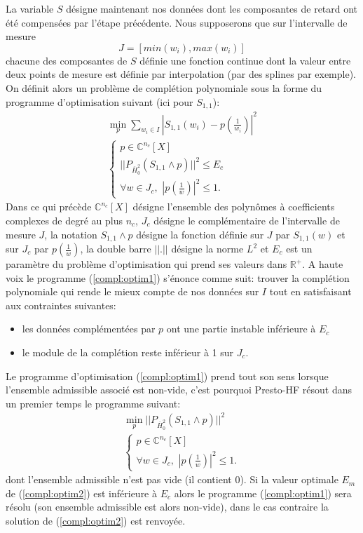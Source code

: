 \documentclass[12]{article}
\def\prest{Presto-HF\xspace}
\newcommand{\HHb}{\overline{H}^2_0}
\def\CC{{\mathbb C}}
\def\RR{{\mathbb R}}
\begin{document}
La variable $S$ d\'esigne maintenant nos donn\'ees dont les
composantes de retard ont \'et\'e compens\'ees par l'\'etape
pr\'ec\'edente. Nous supposerons que sur l'intervalle de mesure 
$$J=[min(w_i),max(w_i)]$$
chacune des composantes de $S$ d\'efinie une
fonction continue dont la valeur entre deux points de mesure est
d\'efinie par interpolation (par des splines par exemple). 
On d\'efinit alors un probl\`eme de compl\'etion polynomiale sous la forme du
programme d'optimisation suivant (ici pour $S_{1,1}$):
\begin{gather}
\min_p \sum_{w_i \in I} |S_{1,1}(w_i)-p(\frac{1}{w_i})|^2 \\
\begin{cases}
\nonumber
p \in \CC^{n_c}[X] \\
||P_{\HHb}(S_{1,1} \wedge p)||^2 \leq E_c \\
\forall w \in J_c,\,\,|p(\frac{1}{w})|^2 \leq 1.
\end{cases} 
\end{gather}
Dans ce qui pr\'ec\`ede $\CC^{n_c}[X]$ d\'esigne l'ensemble des
polyn\^omes \`a coefficients complexes de degr\'e au plus $n_c$, $J_c$
d\'esigne le compl\'ementaire de l'intervalle de mesure $J$, la notation 
$S_{1,1} \wedge p$ d\'esigne la fonction d\'efinie sur $J$ par $S_{1,1}(w)$
et sur $J_c$ par $p(\frac{1}{w})$, la double
barre $||.||$ d\'esigne la norme $L^2$ et $E_c$ est un param\`etre du
probl\`eme d'optimisation qui prend ses valeurs dans $\RR^+$. A haute
voix le programme (\ref{compl:optim1}) s'\'enonce comme suit: trouver
la compl\'etion polynomiale qui rende le mieux compte
de nos donn\'ees sur $I$ tout en satisfaisant aux contraintes
suivantes:
\begin{itemize}
\item les donn\'ees compl\'ement\'ees par $p$ ont une partie
  instable inf\'erieure \`a $E_c$ 
\item le module de la compl\'etion reste inf\'erieur \`a 1 sur $J_c$.
\end{itemize}
Le programme d'optimisation (\ref{compl:optim1}) prend tout son sens
lorsque l'ensemble admissible associ\'e est non-vide, c'est pourquoi
\prest r\'esout dans un premier temps le programme suivant:
\begin{gather}
\label{compl:optim2}
\min_p ||P_{\HHb}(S_{1,1} \wedge p)||^2 \\
\begin{cases}
\nonumber
p \in \CC^{n_c}[X] \\
\forall w \in J_c,\,\,|p(\frac{1}{w})|^2 \leq 1.
\end{cases} 
\end{gather}
dont l'ensemble admissible n'est pas vide (il contient 0). Si la valeur
optimale $E_{m}$ de (\ref{compl:optim2}) est inf\'erieure \`a $E_c$ alors
le programme (\ref{compl:optim1}) sera r\'esolu (son ensemble
admissible est alors non-vide), dans le cas contraire la solution de
(\ref{compl:optim2}) est renvoy\'ee. 
\end{document}
